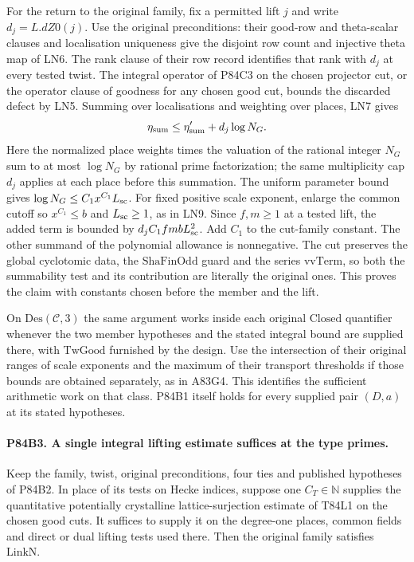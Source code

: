 For the return to the original family, fix a permitted lift
$j$ and write $d_j=L.dZ0(j)$. Use the original preconditions:
their good-row and theta-scalar clauses and localisation
uniqueness give the disjoint row count and injective theta map
of LN6. The rank clause of their row record identifies that
rank with $d_j$ at every tested twist. The integral operator of
P84C3 on the chosen projector cut, or the operator clause of
goodness for any chosen good cut, bounds the discarded defect
by LN5. Summing over localisations and weighting over places,
LN7 gives
\[
             \eta_{\rm sum}\le\eta'_{\rm sum}+d_j\log N_G .
\]
Here the normalized place weights times the valuation of the
rational integer $N_G$ sum to at most $\log N_G$ by rational
prime factorization; the same multiplicity cap $d_j$ applies
at each place before this summation. The uniform parameter bound
gives $\log N_G\le C_1 x^{C_1}L_{\rm sc}$.
For fixed positive scale exponent, enlarge the common cutoff
so $x^{C_1}\le b$ and $L_{\rm sc}\ge1$, as in LN9.
Since $f,m\ge1$ at a tested lift, the added term is bounded by
$d_j C_1 f m b L_{\rm sc}^2$. Add $C_1$ to the cut-family
constant. The other summand of the polynomial allowance is
nonnegative. The cut preserves the global cyclotomic data,
the $\mathrm{ShaFinOdd}$ guard and the series $\mathrm{vvTerm}$,
so both the summability test and its contribution are literally
the original ones. This proves the claim with constants chosen
before the member and the lift.

On $\mathrm{Des}(\mathcal C,3)$ the same argument works inside
each original $\mathrm{Closed}$ quantifier whenever the two
member hypotheses and the stated integral bound are supplied
there, with $\mathrm{TwGood}$ furnished by the design.
Use the intersection of their original ranges of scale
exponents and the maximum of their transport thresholds if
those bounds are obtained separately, as in A83G4.
This identifies the sufficient arithmetic work on that class.
P84B1 itself holds for every supplied pair $(D,a)$ at its
stated hypotheses.

\paragraph{P84B3. A single integral lifting estimate suffices at the type primes.}
Keep the family, twist, original preconditions, four ties and
published hypotheses of P84B2. In place of its tests on Hecke
indices, suppose one $C_T\in\mathbb N$ supplies the quantitative
potentially crystalline lattice-surjection estimate of T84L1 on
the chosen good cuts. It suffices to supply it on the degree-one
places, common fields and direct or dual lifting tests used
there. Then the original family satisfies $\mathrm{LinkN}$.

